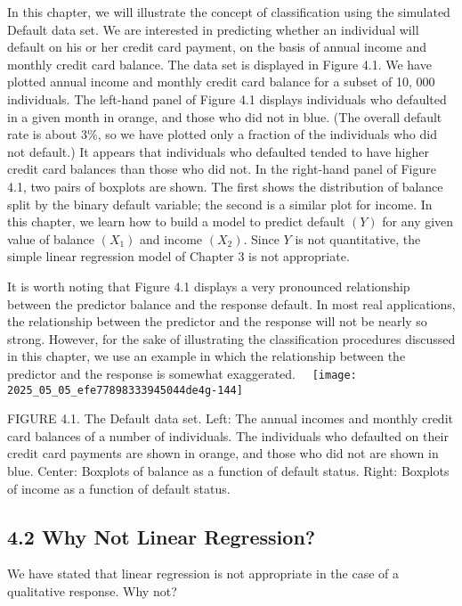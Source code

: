 \documentclass[10pt]{article}
\begin{document}
In this chapter, we will illustrate the concept of classification using the simulated Default data set. We are interested in predicting whether an individual will default on his or her credit card payment, on the basis of annual income and monthly credit card balance. The data set is displayed in Figure 4.1. We have plotted annual income and monthly credit card balance for a subset of 10, 000 individuals. The left-hand panel of Figure 4.1 displays individuals who defaulted in a given month in orange, and those who did not in blue. (The overall default rate is about $3 \%$, so we have plotted only a fraction of the individuals who did not default.) It appears that individuals who defaulted tended to have higher credit card balances than those who did not. In the right-hand panel of Figure 4.1, two pairs of boxplots are shown. The first shows the distribution of balance split by the binary default variable; the second is a similar plot for income. In this chapter, we learn how to build a model to predict default $(Y)$ for any given value of balance $\left(X_{1}\right)$ and income $\left(X_{2}\right)$. Since $Y$ is not quantitative, the simple linear regression model of Chapter 3 is not appropriate.

It is worth noting that Figure 4.1 displays a very pronounced relationship between the predictor balance and the response default. In most real applications, the relationship between the predictor and the response will not be nearly so strong. However, for the sake of illustrating the classification procedures discussed in this chapter, we use an example in which the relationship between the predictor and the response is somewhat exaggerated.\
\
\texttt{[image: 2025\_05\_05\_efe77898333945044de4g-144]}

FIGURE 4.1. The Default data set. Left: The annual incomes and monthly credit card balances of a number of individuals. The individuals who defaulted on their credit card payments are shown in orange, and those who did not are shown in blue. Center: Boxplots of balance as a function of default status. Right: Boxplots of income as a function of default status.

\subsection*{4.2 Why Not Linear Regression?}
We have stated that linear regression is not appropriate in the case of a qualitative response. Why not?
\end{document}
